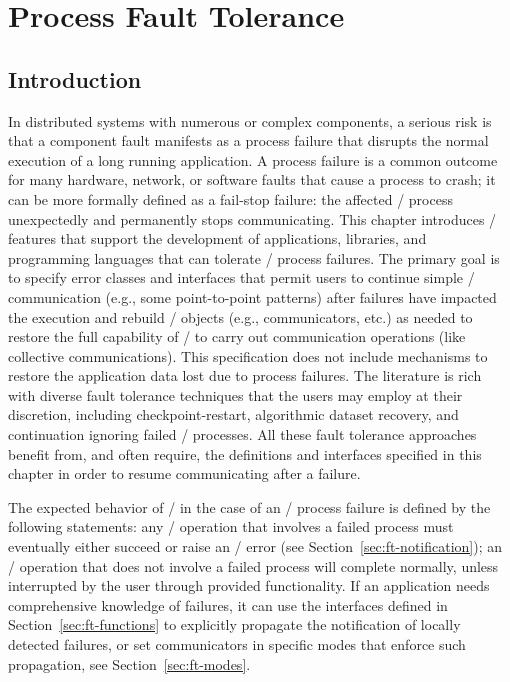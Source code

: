 %
%
%
%

\chapter{Process Fault Tolerance}
\label{sec:ft}
\label{chap:ft}

\section{Introduction}
\label{sec:ft-intro}

\par In distributed systems with numerous or complex components,
a serious risk is that a component fault manifests as a process failure
that disrupts the normal execution of a long running application.
A process failure is a common outcome for many
hardware, network, or software faults that cause a process to crash;
it can be more formally defined as a fail-stop failure: the affected
\MPI/ process unexpectedly and permanently stops communicating.
This chapter introduces \MPI/ features that support the development of
applications, libraries, and programming languages that can tolerate
\MPI/ process failures. The primary goal is to specify error classes and
interfaces that permit users to continue simple \MPI/ communication
(e.g., some point-to-point patterns) after failures have impacted the execution and rebuild
\MPI/ objects (e.g., communicators, etc.) as needed to restore the full
capability of \MPI/ to carry out communication operations (like
collective communications). This specification does not include
mechanisms to restore the application data lost due to process failures. The
literature is rich with diverse fault tolerance techniques that
the users may employ at their discretion, including
checkpoint-restart, algorithmic dataset recovery, and continuation
ignoring failed \MPI/ processes. All these fault tolerance approaches
benefit from, and often require, the definitions and interfaces
specified in this chapter in order to resume communicating after a failure.

\par The expected behavior of \MPI/ in the case of an \MPI/ process failure
is defined by the following statements: any \MPI/ operation that
involves a failed process must eventually either
succeed or raise an \MPI/ error (see
Section~\ref{sec:ft-notification}); an \MPI/ operation that does not
involve a failed process will complete normally, unless interrupted
by the user through provided functionality.
%
If an application
needs comprehensive knowledge of failures, it can use the
interfaces defined in Section~\ref{sec:ft-functions} to explicitly
propagate the notification of locally detected failures, or set
communicators in specific modes that enforce such propagation, see Section~\ref{sec:ft-modes}. %


